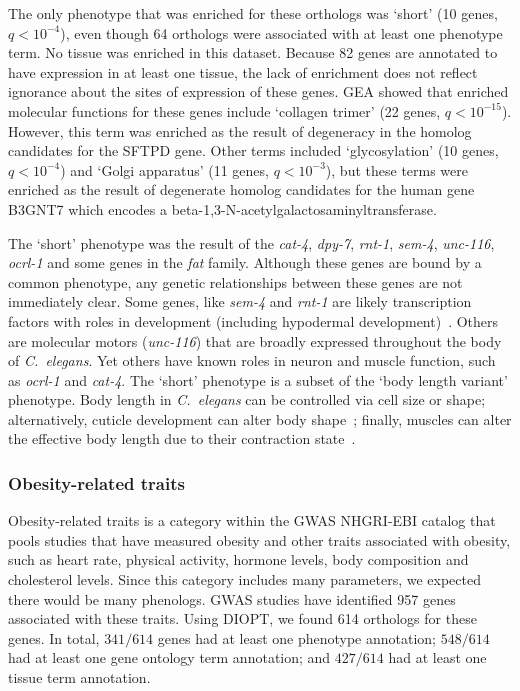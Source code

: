 \documentclass[10pt,letterpaper,twocolumn]{article}
\newcommand{\cel}{\emph{C.~elegans}}
\newcommand{\hobesity}{957}
\newcommand{\wobesity}{614}
\newcommand{\qval}[1]{\ensuremath{q<10^{-#1}}}
\begin{document}
The only phenotype that was enriched for these orthologs was `short' (10 genes,
\qval{4}), even though 64 orthologs were associated with at least
one phenotype term. No tissue was enriched in this dataset. Because
82 genes are annotated to have expression in at least one tissue, the lack of
enrichment does not reflect ignorance about the sites of expression of these
genes. GEA showed that enriched
molecular functions for these genes include `collagen trimer' (22 genes,
\qval{15}). However, this term was enriched as the result of degeneracy in the
homolog candidates for the SFTPD gene. Other terms included
 `glycosylation' (10 genes, \qval{4}) and `Golgi apparatus' (11
genes, \qval{3}), but these terms were enriched as the result of degenerate homolog
candidates for the human gene B3GNT7 which encodes a
beta-1,3-N-acetylgalactosaminyltransferase.

The `short' phenotype was the result of the \emph{cat-4}, \emph{dpy-7},
\emph{rnt-1}, \emph{sem-4}, \emph{unc-116}, \emph{ocrl-1} and some genes in the
\emph{fat} family. Although these genes are bound by a common phenotype, any
genetic relationships between these genes are not immediately clear. Some genes,
like \emph{sem-4} and \emph{rnt-1} are likely transcription factors with roles
in development (including hypodermal development)~\cite{Desai1988,Ji2004}.
Others are molecular motors (\emph{unc-116}) that are broadly expressed throughout
the body of \cel{}. Yet others have known roles in neuron and muscle function,
such as \emph{ocrl-1} and \emph{cat-4}. The `short' phenotype is a subset of
the `body length variant' phenotype. Body length in \cel{} can be controlled via
cell size or shape\cite{Wang2002,Nakano2004}; alternatively, cuticle development can alter body
shape~\cite{Cox1980,Kramer1988}; finally, muscles can alter the effective body
length due to their contraction state~\cite{Lewis1980}.


\subsubsection*{Obesity-related traits}
Obesity-related traits is a category within the GWAS NHGRI-EBI catalog that
pools studies that have measured obesity and other traits associated with
obesity, such as heart rate, physical activity, hormone levels, body composition
and cholesterol levels. Since this category includes many parameters,
we expected there would be many phenologs. GWAS studies have identified
\hobesity{} genes associated with these traits. Using DIOPT, we found
\wobesity{} orthologs for these genes. In total, $341/\wobesity{}$ genes had
at least one phenotype annotation; $548/\wobesity{}$ had at least one gene ontology term
annotation; and $427/\wobesity{}$ had at least one tissue term annotation.
\end{document}
